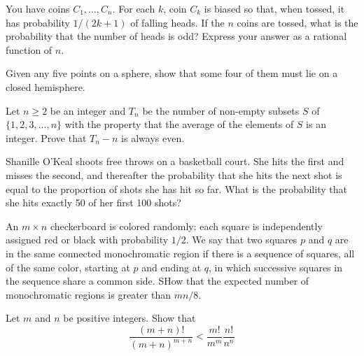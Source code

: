 \documentclass[12pt]{article}
\begin{document}
    \begin{exercise}[2001 A2]
        You have coins \(C_1,\ldots,C_n\).
        For each \(k\), coin \(C_k\) is biased so that, when tossed, it has probability \(1/(2k+1)\) of falling heads.
        If the \(n\) coins are tossed, what is the probability that the number of heads is odd?
        Express your answer as a rational function of \(n\).
    \end{exercise}

    \begin{exercise}[2002 A1]
        Given any five points on a sphere, show that some four of them must lie on a closed hemisphere.
    \end{exercise}

    \begin{exercise}[2002 A3]
        Let $n\geqslant 2$ be an integer and $T_n$ be the number of non-empty subsets $S$ of $\{1, 2, 3, \dots, n\}$ with the property that the average of the elements of $S$ is an integer. Prove that $T_n - n$ is always even.
    \end{exercise}

    \begin{exercise}[2002 B1]
        Shanille O'Keal shoots free throws on a basketball court.
        She hits the first and misses the second, and thereafter the probability that she hits the next shot is equal to the proportion of shots she has hit so far.
        What is the probability that she hits exactly 50 of her first 100 shots?
    \end{exercise}

    \begin{exercise}[2004 A5]
        An \(m\times n\) checkerboard is colored randomly: each square is independently assigned red or black with probability \(1/2\).
        We say that two squares \(p\) and \(q\) are in the same connected monochromatic region if there is a sequence of squares, all of the same color, starting at \(p\) and ending at \(q\), in which successive squares in the sequence share a common side.
        SHow that the expected number of monochromatic regions is greater than \(mn/8\).
    \end{exercise}

    \begin{exercise}[2004 B2]
        Let \(m\) and \(n\) be positive integers.
        Show that
        \[\frac{(m+n)!}{(m+n)^{m+n}}<\frac{m!}{m^m}\frac{n!}{n^n}\]
    \end{exercise}
\end{document}
